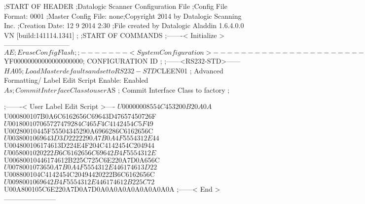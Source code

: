 ;START OF HEADER
;Datalogic Scanner Configuration File
;Config File Format: 0001
;Master Config File: none;Copyright 2014 by Datalogic Scanning Inc.
;Creation Date: 12 9 2014 2:30
;File created by Datalogic Aladdin 1.6.4.0.0 VN [build:141114.1341]
;
;START OF COMMANDS
;-------< Initialize >-----------------------------
$AE                 ; Erase Config Flash
;
;-------< System Configuration >-------------------------------
$YF00000000000000000000; CONFIGURATION ID
;
;------<RS232-STD>------
$HA05               ; Load Master defaults and set to RS232-STD
$CLEEN01            ; Advanced Formatting/ Label Edit Script Enable: Enabled
$As                 ; Commit Interface Class to user
$AS                 ; Commit Interface Class to factory
;

;-------< User Label Edit Script >----
$U00000008554C453200B20A0A
$U000800107B0A6C6162656C69643D47657450726F
$U001800107065727479284C465F4C4142454C5F49
$U00280010445F55504345290A6966286C6162656C
$U0038001069643D3D2222290A7B0A4F5554312E44
$U004800106174613D224E4F204C4142454C204944
$U0058001020222B6C6162656C69642B4F5554312E
$U00680010446174612B225C725C6E220A7D0A656C
$U0078001073650A7B0A4F5554312E446174613D22
$U008800104C4142454C20494420222B6C6162656C
$U0098001069642B4F5554312E446174612B225C72
$U00A800105C6E220A7D0A7D0A0A0A0A0A0A0A0A0A
;------< End >-----------------------
